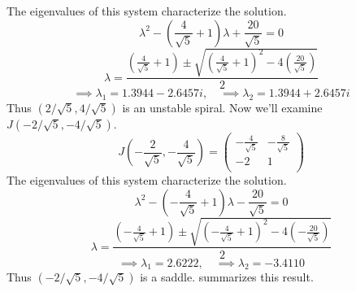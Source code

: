 \documentclass[12pt,twoside]{article}
\begin{document}
The eigenvalues of this system characterize the solution.
\begin{equation*}
  \lambda^2 - \left(\frac{4}{\sqrt{5}}+1\right)\lambda + \frac{20}{\sqrt{5}} = 0
\end{equation*}
\begin{equation*}
  \lambda = \frac{\left(\frac{4}{\sqrt{5}}+1\right) \pm
    \sqrt{{\left(\frac{4}{\sqrt{5}}+1\right)}^2-4\left(\frac{20}{\sqrt{5}}\right)}}{2}
\end{equation*}
\begin{equation*}
  \implies \lambda_1 = 1.3944 - 2.6457i, \quad \implies \lambda_2 = 1.3944 + 2.6457i
\end{equation*}
Thus $(2/\sqrt{5},4/\sqrt{5})$ is an unstable spiral. Now we'll examine
$J(-2/\sqrt{5},-4/\sqrt{5})$.
\begin{equation*}
  J\left(-\frac{2}{\sqrt{5}},-\frac{4}{\sqrt{5}}\right) =
  \begin{pmatrix}
    -\frac{4}{\sqrt{5}} & -\frac{8}{\sqrt{5}} \\ -2 & 1 \\
  \end{pmatrix}
\end{equation*}
The eigenvalues of this system characterize the solution.
\begin{equation*}
  \lambda^2 - \left(-\frac{4}{\sqrt{5}}+1\right)\lambda - \frac{20}{\sqrt{5}} = 0
\end{equation*}
\begin{equation*}
  \lambda = \frac{\left(-\frac{4}{\sqrt{5}}+1\right) \pm
    \sqrt{{\left(-\frac{4}{\sqrt{5}}+1\right)}^2-4\left(-\frac{20}{\sqrt{5}}\right)}}{2}
\end{equation*}
\begin{equation*}
  \implies \lambda_1 = 2.6222, \quad \implies \lambda_2 = -3.4110
\end{equation*}
Thus $(-2/\sqrt{5},-4/\sqrt{5})$ is a saddle. 
summarizes this result.
\end{document}
